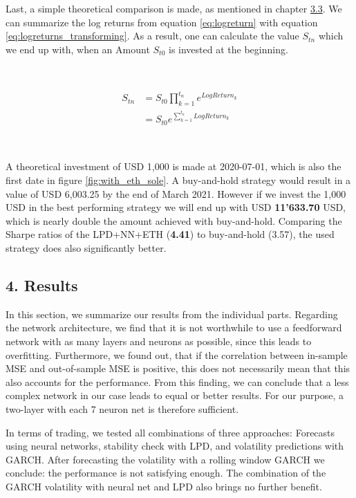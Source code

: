 \documentclass[
]{article}
\begin{document}
Last, a simple theoretical comparison is made, as mentioned in chapter
\protect\hyperlink{trading-strat}{3.3}. We can summarize the log returns
from equation \ref{eq:logreturn} with equation
\ref{eq:logreturns_transforming}. As a result, one can calculate the
value \(S_{tn}\) which we end up with, when an Amount \(S_{t0}\) is
invested at the beginning.

~

\begin{align} \label{eq:logreturns_transforming}
S_{tn} &=S_{t0}\prod_{k=1}^{t_{n}}e^{LogReturn_{k}} \\
&=S_{t0}e^{ \sum_{k = 1}^{t_{n}} LogReturn_{k} } \nonumber
\end{align}

~

A theoretical investment of USD 1,000 is made at 2020-07-01, which is
also the first date in figure \ref{fig:with_eth_sole}. A buy-and-hold
strategy would result in a value of USD 6,003.25 by the end of March
2021. However if we invest the 1,000 USD in the best performing strategy
we will end up with USD \textbf{11'633.70} USD, which is nearly double
the amount achieved with buy-and-hold. Comparing the Sharpe ratios of
the LPD+NN+ETH (\textbf{4.41}) to buy-and-hold (3.57), the used strategy
does also significantly better.

\newpage

\hypertarget{results}{%
\subsection{4. Results}\label{results}}

In this section, we summarize our results from the individual parts.
Regarding the network architecture, we find that it is not worthwhile to
use a feedforward network with as many layers and neurons as possible,
since this leads to overfitting. Furthermore, we found out, that if the
correlation between in-sample MSE and out-of-sample MSE is positive,
this does not necessarily mean that this also accounts for the
performance. From this finding, we can conclude that a less complex
network in our case leads to equal or better results. For our purpose, a
two-layer with each 7 neuron net is therefore sufficient.

In terms of trading, we tested all combinations of three approaches:
Forecasts using neural networks, stability check with LPD, and
volatility predictions with GARCH. After forecasting the volatility with
a rolling window GARCH we conclude: the performance is not satisfying
enough. The combination of the GARCH volatility with neural net and LPD
also brings no further benefit.
\end{document}
